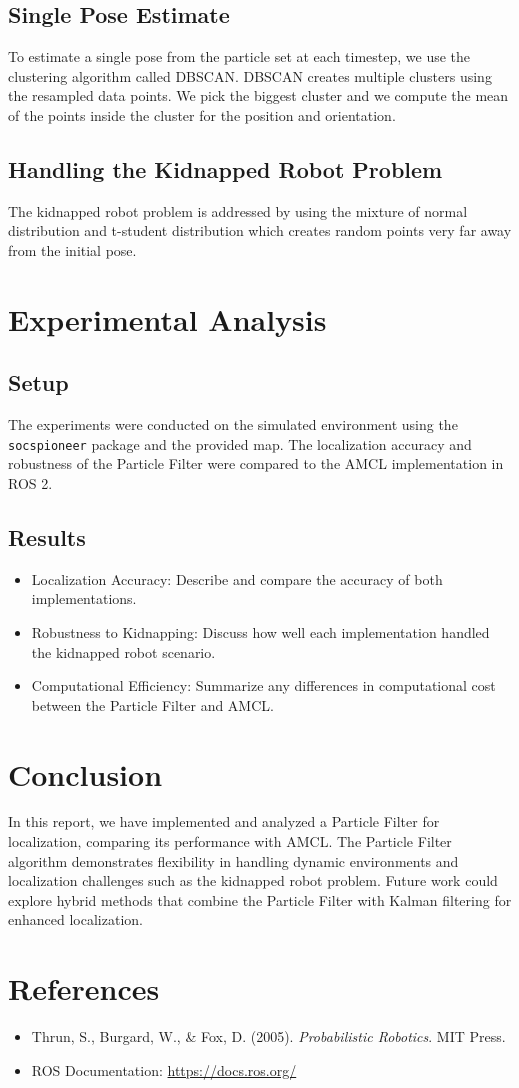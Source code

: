 \documentclass[11pt]{article}
\begin{document}
\subsection{Single Pose Estimate}
To estimate a single pose from the particle set at each timestep, we use the clustering algorithm called DBSCAN. DBSCAN creates multiple clusters using the resampled data points. We pick the biggest cluster and we compute the mean of the points inside the cluster for the position and orientation.

\subsection{Handling the Kidnapped Robot Problem}
The kidnapped robot problem is addressed by using the mixture of normal distribution and t-student distribution which creates random points very far away from the initial pose.

\section{Experimental Analysis}

\subsection{Setup}
The experiments were conducted on the simulated environment using the \texttt{socspioneer} package and the provided map. The localization accuracy and robustness of the Particle Filter were compared to the AMCL implementation in ROS 2.

\subsection{Results}
\begin{itemize}
    \item Localization Accuracy: Describe and compare the accuracy of both implementations.
    \item Robustness to Kidnapping: Discuss how well each implementation handled the kidnapped robot scenario.
    \item Computational Efficiency: Summarize any differences in computational cost between the Particle Filter and AMCL.
\end{itemize}


\section{Conclusion}
In this report, we have implemented and analyzed a Particle Filter for localization, comparing its performance with AMCL. The Particle Filter algorithm demonstrates flexibility in handling dynamic environments and localization challenges such as the kidnapped robot problem. Future work could explore hybrid methods that combine the Particle Filter with Kalman filtering for enhanced localization.

\section*{References}
\begin{itemize}
    \item Thrun, S., Burgard, W., \& Fox, D. (2005). \textit{Probabilistic Robotics}. MIT Press.
    \item ROS Documentation: \url{https://docs.ros.org/}
\end{itemize}
\end{document}
